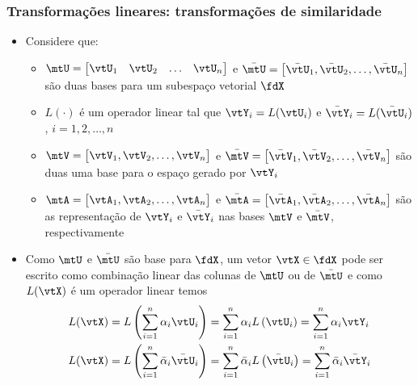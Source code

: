\begin{frame}
  \frametitle{Transformações lineares: transformações de similaridade}
  \begin{itemize}
    \item Considere que:
    \begin{itemize}
      \item $\mtU = \left[\begin{matrix} \vtU_1 & \vtU_2 & \ldots & \vtU_n\end{matrix}\right]$ e $\bar{\mtU} = \left[\begin{matrix} \bar{\vtU}_1, \bar{\vtU}_2, \ldots, \bar{\vtU}_n\end{matrix}\right]$ são duas bases para um subespaço vetorial $\fdX$
      \item $L(\cdot)$ é um operador linear tal que $\vtY_i = L(\vtU_i)$ e $\bar{\vtY}_i = L(\bar{\vtU}_i)$, $i = 1, 2, \ldots, n$
      \item $\mtV = \left[\begin{matrix}\vtV_1, \vtV_2, \ldots, \vtV_n\end{matrix}\right]$ e $\bar{\mtV} = \left[\begin{matrix}\bar{\vtV}_1, \bar{\vtV}_2, \ldots, \bar{\vtV}_n\end{matrix}\right]$ são duas uma base para o espaço gerado por $\vtY_i$
      \item $\mtA = \left[\begin{matrix}\vtA_1, \vtA_2, \ldots, \vtA_n\end{matrix}\right]$ e $\bar{\mtA} = \left[\begin{matrix}\bar{\vtA}_1, \bar{\vtA}_2, \ldots, \bar{\vtA}_n\end{matrix}\right]$ são as representação de $\vtY_i$ e $\bar{\vtY}_i$ nas bases $\mtV$ e $\bar{\mtV}$, respectivamente
    \end{itemize}
    \item Como $\mtU$ e $\bar{\mtU}$ são base para $\fdX$, um vetor $\vtX \in \fdX$ pode ser escrito como combinação linear das colunas de $\mtU$ ou de $\bar{\mtU}$ e como $L(\vtX)$ é um operador linear temos
    \begin{subequations}\label{eq_transf_sim_lin_op}
      \begin{align}
        L(\vtX) &= L\left(\sum\limits_{i = 1}^n \alpha_i\vtU_i\right) = \sum\limits_{i = 1}^n \alpha_iL\left(\vtU_i\right) = \sum\limits_{i = 1}^n \alpha_i\vtY_i \label{eq_transf_sim_lin_op_a} \\
        L(\vtX) &= L\left(\sum\limits_{i = 1}^n \bar{\alpha}_i\bar{\vtU}_i\right) = \sum\limits_{i = 1}^n \bar{\alpha}_iL\left(\bar{\vtU}_i\right) = \sum\limits_{i = 1}^n \bar{\alpha}_i\bar{\vtY}_i \label{eq_transf_sim_lin_op_b}
      \end{align}
    \end{subequations}
  \end{itemize}
\end{frame}

